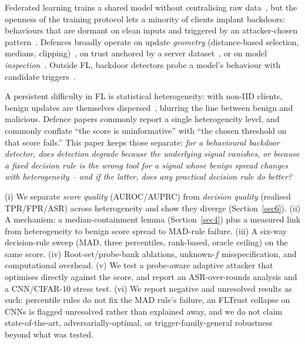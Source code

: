 \documentclass[sn-mathphys-num]{sn-jnl}
\makeatletter
\renewcommand\section{\@startsection{section}{1}{\z@}{-10pt \@plus -3pt \@minus -2pt}{6pt}{\sectionfont}}
\renewcommand\paragraph{\@startsection{paragraph}{4}{\z@}{-9pt \@plus -3pt \@minus-1pt}{2pt}{\paragraphfont}}
\makeatother
\begin{document}
\section{Introduction}\label{sec1}
Federated learning trains a shared model without centralising raw data~\cite{mcmahan2017fedavg}, but the openness of the training protocol lets a minority of clients implant backdoors: behaviours that are dormant on clean inputs and triggered by an attacker-chosen pattern~\cite{gu2019badnets,bagdasaryan2020backdoor,bhagoji2019adversarial}. Defences broadly operate on update \emph{geometry} (distance-based selection, medians, clipping)~\cite{blanchard2017krum,yin2018byzantine,sun2019really}, on trust anchored by a server dataset~\cite{cao2021fltrust}, or on model \emph{inspection}~\cite{rieger2022deepsight,nguyen2022flame}. Outside FL, backdoor detectors probe a model's behaviour with candidate triggers~\cite{wang2019neuralcleanse,kolouri2020ulp}.

A persistent difficulty in FL is statistical heterogeneity: with non-IID clients, benign updates are themselves dispersed~\cite{hsu2019measuring,li2020fedprox}, blurring the line between benign and malicious. Defence papers commonly report a single heterogeneity level, and commonly conflate ``the score is uninformative'' with ``the chosen threshold on that score fails.'' This paper keeps those separate: \emph{for a behavioural backdoor detector, does detection degrade because the underlying signal vanishes, or because a fixed decision rule is the wrong tool for a signal whose benign spread changes with heterogeneity -- and if the latter, does any practical decision rule do better?}

\paragraph{Contributions.}
(i) We separate \emph{score quality} (AUROC/AUPRC) from \emph{decision quality} (realised TPR/FPR/ASR) across heterogeneity and show they diverge (Section~\ref{sec6}). (ii) A mechanism: a median-containment lemma (Section~\ref{sec4}) plus a measured link from heterogeneity to benign score spread to MAD-rule failure. (iii) A six-way decision-rule sweep (MAD, three percentiles, rank-based, oracle ceiling) on the same score. (iv) Root-set/probe-bank ablations, unknown-$f$ misspecification, and computational overhead. (v) We test a probe-aware adaptive attacker that optimises directly against the score, and report an ASR-over-rounds analysis and a CNN/CIFAR-10 stress test. (vi) We report negative and unresolved results as such: percentile rules do not fix the MAD rule's failure, an FLTrust collapse on CNNs is flagged unresolved rather than explained away, and we do not claim state-of-the-art, adversarially-optimal, or trigger-family-general robustness beyond what was tested.
\end{document}
